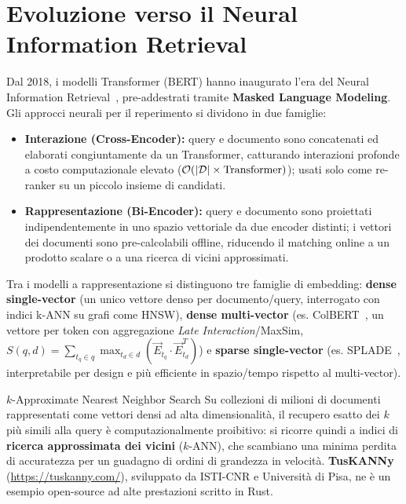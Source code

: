 \FloatBarrier
\section{Evoluzione verso il Neural Information Retrieval}
\label{sec:evoluzione-neural-ir}

Dal 2018, i modelli Transformer (BERT) hanno inaugurato l'era del Neural Information Retrieval~\cite{khattab2020,formal2021}, pre-addestrati tramite \textbf{Masked Language Modeling}. Gli approcci neurali per il reperimento si dividono in due famiglie:
\begin{itemize}
    \item \textbf{Interazione (Cross-Encoder):} query e documento sono concatenati ed elaborati congiuntamente da un Transformer, catturando interazioni profonde a costo computazionale elevato ($\mathcal{O}\!\left(|\mathcal{D}| \times \text{Transformer}\right)$); usati solo come re-ranker su un piccolo insieme di candidati.
    \item \textbf{Rappresentazione (Bi-Encoder):} query e documento sono proiettati indipendentemente in uno spazio vettoriale da due encoder distinti; i vettori dei documenti sono pre-calcolabili offline, riducendo il matching online a un prodotto scalare o a una ricerca di vicini approssimati.
\end{itemize}

Tra i modelli a rappresentazione si distinguono tre famiglie di embedding: \textbf{dense single-vector} (un unico vettore denso per documento/query, interrogato con indici k-ANN su grafi come HNSW), \textbf{dense multi-vector} (es. ColBERT~\cite{khattab2020}, un vettore per token con aggregazione \textit{Late Interaction}/MaxSim, $S(q,d) = \sum_{t_q \in q} \max_{t_d \in d} (\vec{E}_{t_q} \cdot \vec{E}_{t_d}^T)$) e \textbf{sparse single-vector} (es. SPLADE~\cite{formal2021}, interpretabile per design e pi\`u efficiente in spazio/tempo rispetto al multi-vector).

\begin{noteblock}{$k$-Approximate Nearest Neighbor Search}
Su collezioni di milioni di documenti rappresentati come vettori densi ad alta dimensionalit\`a, il recupero esatto dei $k$ pi\`u simili alla query \`e computazionalmente proibitivo: si ricorre quindi a indici di \textbf{ricerca approssimata dei vicini} ($k$-ANN), che scambiano una minima perdita di accuratezza per un guadagno di ordini di grandezza in velocit\`a. \textbf{TusKANNy} (\url{https://tuskanny.com/}), sviluppato da ISTI-CNR e Universit\`a di Pisa, ne \`e un esempio open-source ad alte prestazioni scritto in Rust.
\end{noteblock}
